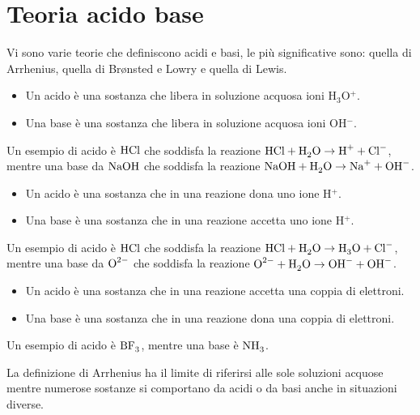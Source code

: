 \section{Teoria acido base}
Vi sono varie teorie che definiscono acidi e basi, le più significative sono: quella di Arrhenius, quella di Br\o nsted e Lowry e quella di Lewis.
\begin{defn}\hfill
    \begin{itemize}
        \item Un acido è una sostanza che libera in soluzione acquosa ioni \textnormal{H}$_3$\textnormal{O}$^+$.
        \item Una base è una sostanza che libera in soluzione acquosa ioni \textnormal{OH}$^-$.
    \end{itemize}    
\end{defn}
\begin{ex}[Arrhenius] Un esempio di acido è $\ce{HCl}$ che soddisfa la reazione $\ce{HCl}+\ce{H2O}\to\ce{H+}+\ce{Cl-}$, mentre una base da $\ce{NaOH}$ che soddisfa la reazione $\ce{NaOH}+\ce{H2O}\to\ce{Na+}+\ce{OH-}$.
\end{ex}
\begin{defn}\hfill
    \begin{itemize}
        \item Un acido è una sostanza che in una reazione dona uno ione \textnormal{H}$^+$.
        \item Una base è una sostanza che in una reazione accetta uno ione \textnormal{H}$^+$.
    \end{itemize}    
\end{defn}
\begin{ex} Un esempio di acido è $\ce{HCl}$ che soddisfa la reazione $\ce{HCl}+\ce{H2O}\to\ce{H3O}+\ce{Cl-}$, mentre una base da $\ce{O^2-}$ che soddisfa la reazione $\ce{O^2-}+\ce{H2O}\to\ce{OH-}+\ce{OH-}$.
\end{ex}
\begin{defn}\hfill
    \begin{itemize}
        \item Un acido è una sostanza che in una reazione accetta una coppia di elettroni.
        \item Una base è una sostanza che in una reazione dona una coppia di elettroni.
    \end{itemize}
\end{defn}
\begin{ex}[Lewis] Un esempio di acido è $\ce{BF_3}$, mentre una base è $\ce{NH_3}$.
\end{ex}
\begin{obs}
    La definizione di Arrhenius ha il limite di riferirsi alle sole soluzioni acquose mentre numerose sostanze si comportano da acidi o da basi anche in situazioni diverse.
\end{obs}

